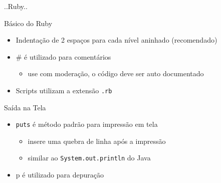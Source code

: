 \begin{frame}[fragile,t]{..Ruby..}
		
\end{frame}
\begin{frame}[fragile,t]{Básico do Ruby}
  \begin{itemize}
    \item Indentação de 2 espaços para cada nível aninhado (\alert{recomendado})
    \item \# é utilizado para comentários
    \begin{itemize}
    	\item use com moderação, o código deve ser auto documentado
    \end{itemize}
    \item Scripts utilizam a extensão \verb!.rb! 
		
  \end{itemize}   
\end{frame}
\begin{frame}[fragile,t]{Saída na Tela}
  \begin{itemize}
    \item \verb!puts! é método \alert{padrão} para impressão em tela 
    \begin{itemize}
    	\item insere uma quebra de linha após a impressão
    	\item similar ao \verb!System.out.println! do Java
    \end{itemize}
    \item \alert{p} é utilizado para depuração
  \end{itemize}   
\end{frame}
